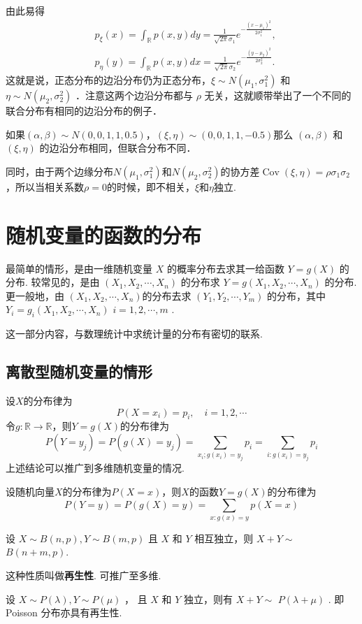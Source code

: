 由此易得
$$
    \begin{aligned}
         & p_{\xi}(x)=\int_{\mathbb{R}} p(x, y) d y=\frac{1}{\sqrt{2 \pi} \sigma_1} e^{-\frac{\left(x-\mu_1\right)^2}{2 \sigma_1^2}}, \\
         & p_\eta(y)=\int_{\mathbb{R}} p(x, y) d x=\frac{1}{\sqrt{2 \pi} \sigma_2} e^{-\frac{\left(y-\mu_2\right)^2}{2 \sigma_2^2}} .
    \end{aligned}
$$
这就是说，正态分布的边沿分布仍为正态分布，$\xi \sim N\left(\mu_1, \sigma_1^2\right)$ 和 $\eta \sim N\left(\mu_2, \sigma_2^2\right)$ ．注意这两个边沿分布都与 $\rho$ 无关，这就顺带举出了一个不同的联合分布有相同的边沿分布的例子．
\begin{example}
    如果$(\alpha,\beta)\sim N(0,0,1,1,0.5)$，$(\xi,\eta)\sim (0,0,1,1,-0.5)$那么 $(\alpha,\beta)$ 和 $(\xi,\eta)$ 的边沿分布相同，但联合分布不同．
\end{example}

同时，由于两个边缘分布$N(\mu_1,\sigma_1^2)$和$N(\mu_2,\sigma_2^2)$的协方差$\operatorname{Cov}(\xi,\eta)=\rho\sigma_1\sigma_2$，所以当相关系数$\rho=0$的时候，即不相关，$\xi$和$\eta$独立. 

\section{随机变量的函数的分布}

最简单的情形，是由一维随机变量 $X$ 的概率分布去求其一给函数 $Y=g(X)$ 的分布. 较常见的，是由 $\left(X_1, X_2, \cdots, X_n\right)$ 的分布求 $Y=g\left(X_1, X_2, \cdots, X_n\right)$ 的分布. 更一般地，由 $\left(X_1, X_2, \cdots, X_n\right)$的分布去求 $\left(Y_1, Y_2, \cdots, Y_m\right)$ 的分布，其中 $Y_i=g_i\left(X_1, X_2, \cdots, X_n\right)$ $i=1,2, \cdots, m$ .

这一部分内容，与数理统计中求统计量的分布有密切的联系.

\subsection{离散型随机变量的情形}

设$X$的分布律为
\[
    P(X=x_i)=p_i, \quad i=1,2,\cdots
\]
令$g:\mathbb{R}\to\mathbb{R}$，则$Y=g(X)$的分布律为
\[
    P(Y=y_j)=P(g(X)=y_j)=\sum_{x_i;g(x_i)=y_j}p_i=\sum_{i:g(x_i)=y_j}p_i
\]
上述结论可以推广到多维随机变量的情况.

设随机向量$X$的分布律为$P(X=x)$，则$X$的函数$Y=g(X)$的分布律为
\[
    P(Y=y)=P(g(X)=y)=\sum_{x:g(x)=y}p(X=x)
\]
\begin{example}
    设 $X \sim B(n, p), Y \sim B(m, p)$ 且 $X$ 和 $Y$ 相互独立，则 $X+Y \sim$ $B(n+m, p)$.
\end{example}
这种性质叫做\textbf{再生性}. 可推广至多维.
\begin{example}
    设 $X \sim P(\lambda), Y \sim P(\mu)$ ， 且 $X$ 和 $Y$ 独立，则有 $X+Y \sim$ $P(\lambda+\mu)$ . 即 Poisson 分布亦具有再生性.
\end{example}

